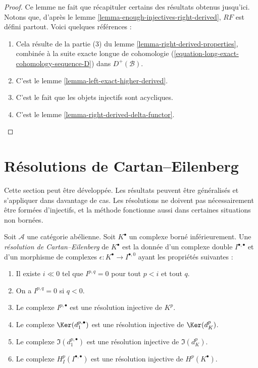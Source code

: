 \begin{proof}
Ce lemme ne fait que récapituler certains des résultats obtenus jusqu'ici.
Notons que, d'après le lemme
\ref{lemma-enough-injectives-right-derived}, $RF$ est défini partout. Voici
quelques références :
\begin{enumerate}
\item Cela résulte de la partie (3) du
lemme \ref{lemma-right-derived-properties}, combinée à la suite exacte
longue de cohomologie (\ref{equation-long-exact-cohomology-sequence-D}) dans
$D^{+}(\mathcal{B})$.
\item C'est le lemme \ref{lemma-left-exact-higher-derived}.
\item C'est le fait que les objets injectifs sont acycliques.
\item C'est le lemme \ref{lemma-right-derived-delta-functor}.
\end{enumerate}
\end{proof}


\section{Résolutions de Cartan--Eilenberg}
\label{section-cartan-eilenberg}

\noindent
Cette section peut être développée. Les résultats peuvent être généralisés et
s'appliquer dans davantage de cas. Les résolutions ne doivent pas
nécessairement être formées d'injectifs, et la méthode fonctionne aussi dans
certaines situations non bornées.

\begin{definition}
\label{definition-cartan-eilenberg}
Soit $\mathcal{A}$ une catégorie abélienne.
Soit $K^\bullet$ un complexe borné inférieurement.
Une {\it résolution de Cartan--Eilenberg} de $K^\bullet$ est la donnée d'un
complexe double $I^{\bullet, \bullet}$ et d'un morphisme de complexes
$\epsilon : K^\bullet \to I^{\bullet, 0}$ ayant les propriétés suivantes :
\begin{enumerate}
\item Il existe $i \ll 0$ tel que $I^{p, q} = 0$ pour tout $p < i$ et tout
$q$.
\item On a $I^{p, q} = 0$ si $q < 0$.
\item Le complexe $I^{p, \bullet}$ est une résolution injective de $K^p$.
\item Le complexe $\Ker(d_1^{p, \bullet})$ est une résolution injective de
$\Ker(d_K^p)$.
\item Le complexe $\Im(d_1^{p, \bullet})$ est une résolution injective de
$\Im(d_K^p)$.
\item Le complexe $H^p_I(I^{\bullet, \bullet})$ est une résolution injective
de $H^p(K^\bullet)$.
\end{enumerate}
\end{definition}

